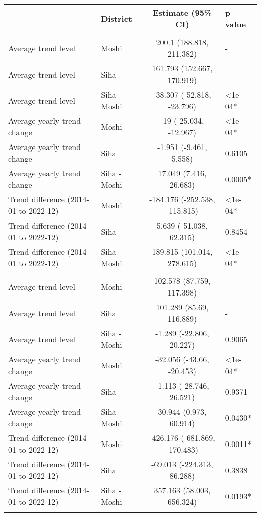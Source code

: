 \begin{longtable}{l|lcl}
\toprule
\multicolumn{1}{l}{} & District & Estimate (95\% CI) & p value \\ 
\midrule\addlinespace[2.5pt]
\multicolumn{4}{l}{Chronic Respiratory Disease} \\ 
\midrule\addlinespace[2.5pt]
Average trend level & Moshi & 200.1 (188.818, 211.382) & - \\ 
Average trend level & Siha & 161.793 (152.667, 170.919) & - \\ 
Average trend level & Siha - Moshi & -38.307 (-52.818, -23.796) & <1e-04* \\ 
Average yearly trend change & Moshi & -19 (-25.034, -12.967) & <1e-04* \\ 
Average yearly trend change & Siha & -1.951 (-9.461, 5.558) & 0.6105 \\ 
Average yearly trend change & Siha - Moshi & 17.049 (7.416, 26.683) & 0.0005* \\ 
Trend difference (2014-01 to 2022-12) & Moshi & -184.176 (-252.538, -115.815) & <1e-04* \\ 
Trend difference (2014-01 to 2022-12) & Siha & 5.639 (-51.038, 62.315) & 0.8454 \\ 
Trend difference (2014-01 to 2022-12) & Siha - Moshi & 189.815 (101.014, 278.615) & <1e-04* \\ 
\midrule\addlinespace[2.5pt]
\multicolumn{4}{l}{Caries} \\ 
\midrule\addlinespace[2.5pt]
Average trend level & Moshi & 102.578 (87.759, 117.398) & - \\ 
Average trend level & Siha & 101.289 (85.69, 116.889) & - \\ 
Average trend level & Siha - Moshi & -1.289 (-22.806, 20.227) & 0.9065 \\ 
Average yearly trend change & Moshi & -32.056 (-43.66, -20.453) & <1e-04* \\ 
Average yearly trend change & Siha & -1.113 (-28.746, 26.521) & 0.9371 \\ 
Average yearly trend change & Siha - Moshi & 30.944 (0.973, 60.914) & 0.0430* \\ 
Trend difference (2014-01 to 2022-12) & Moshi & -426.176 (-681.869, -170.483) & 0.0011* \\ 
Trend difference (2014-01 to 2022-12) & Siha & -69.013 (-224.313, 86.288) & 0.3838 \\ 
Trend difference (2014-01 to 2022-12) & Siha - Moshi & 357.163 (58.003, 656.324) & 0.0193* \\ 
\midrule\addlinespace[2.5pt]

\end{longtable}
